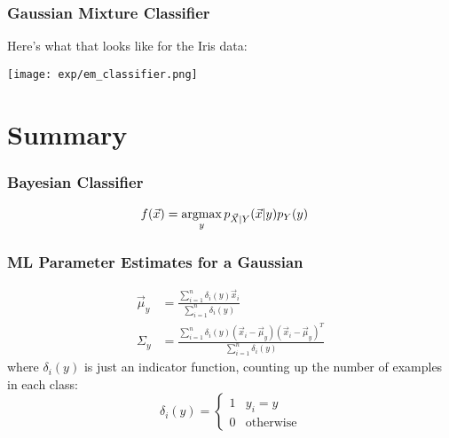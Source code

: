 \documentclass{beamer}
\newcommand{\argmax}{\operatornamewithlimits{argmax}}
\begin{document}
\begin{frame}
  \frametitle{Gaussian Mixture Classifier}
  Here's what that  looks like for the Iris data:
  \centerline{\texttt{[image: exp/em\_classifier.png]}}
\end{frame}

\section[Summary]{Summary}
\setcounter{subsection}{1}

\begin{frame}
  \frametitle{Bayesian Classifier}

  \begin{align*}
    f(\vec{x}) 
    &= \argmax_y p_{\vec{X}|Y}(\vec{x}|y)p_Y(y)
  \end{align*}
\end{frame}

\begin{frame}
  \frametitle{ML Parameter Estimates for a Gaussian}

  \begin{align*}
    \vec\mu_y &= \frac{\sum_{i=1}^n \delta_i(y) \vec{x}_i}{\sum_{i=1}^n\delta_i(y)}\\
    \Sigma_y &= \frac{\sum_{i=1}^n \delta_i(y) (\vec{x}_i-\vec\mu_y)(\vec{x}_i-\vec\mu_y)^T}{\sum_{i=1}^n\delta_i(y)}
  \end{align*}
  where $\delta_i(y)$ is just an indicator function, counting up the
  number of examples in each class:
  \begin{displaymath}
    \delta_i(y)=\begin{cases}
    1 & y_i=y\\
    0 & \mbox{otherwise}
    \end{cases}
  \end{displaymath}
\end{frame}
\end{document}
